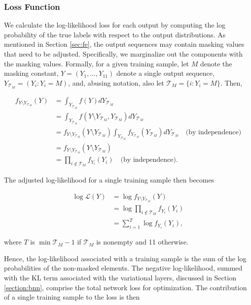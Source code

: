 \documentclass{article}
\begin{document}
\subsubsection{Loss Function}\label{sec:loss-function}

We calculate the log-likelihood loss for each output by computing the log probability of the true labels with respect to the output distributions. As mentioned in Section \ref{sec:fe}, the output sequences may contain masking values that need to be adjusted. Specifically, we marginalize out the components with the masking values. Formally, for a given training sample, let $M$ denote the masking constant, $Y=(Y_1,\dots,Y_{11})$ denote a single output sequence, $Y_{\mathcal{T}_M} = (Y_i: Y_i = M)$, and, abusing notation, also let $\mathcal{T}_M = \{i: Y_i = M\}$. Then,

\begin{align}
    f_{Y\setminus Y_{\mathcal{T}_M}}(Y) &= \int_{Y_{\mathcal{T}_M}} f(Y) dY_{\mathcal{T}_M}\\
         &= \int_{Y_{\mathcal{T}_M}} f(Y\setminus Y_{\mathcal{T}_M}, Y_{\mathcal{T}_M}) dY_{\mathcal{T}_M}\\
         &= f_{Y\setminus Y_{\mathcal{T}_M}}(Y\setminus Y_{\mathcal{T}_M}) \int_{Y_{\mathcal{T}_M}} f_{Y_{\mathcal{T}_M}}(Y_{\mathcal{T}_M}) dY_{\mathcal{T}_M} \quad \text{(by independence)}\\
         &= f_{Y\setminus Y_{\mathcal{T}_M}}(Y\setminus Y_{\mathcal{T}_M})\\
         &= \prod_{i \notin \mathcal{T}_M} f_{Y_i}(Y_i) \quad \text{(by independence)}.
\end{align}

The adjusted log-likelihood for a single training sample then becomes

\begin{align}
    \log\mathcal{L}(Y) &= \log  f_{Y\setminus Y_{\mathcal{T}_M}}(Y)\\
                       &= \log \prod_{i \notin \mathcal{T}_M} f_{Y_i}(Y_i)\\
                       &= \sum_{i = 1}^{T}\log f_{Y_i}(Y_i),
\end{align}

where $T$ is $\min \mathcal{T}_M - 1$ if $\mathcal{T}_M$ is nonempty and 11 otherwise.

Hence, the log-likelihood associated with a training sample is the sum of the log probabilities of the non-masked elements. The negative log-likelihood, summed with the KL term associated with the variational layers, discussed in Section  \ref{section:bnn}, comprise the total network loss for optimization. The contribution of a single training sample to the loss is then
\end{document}
